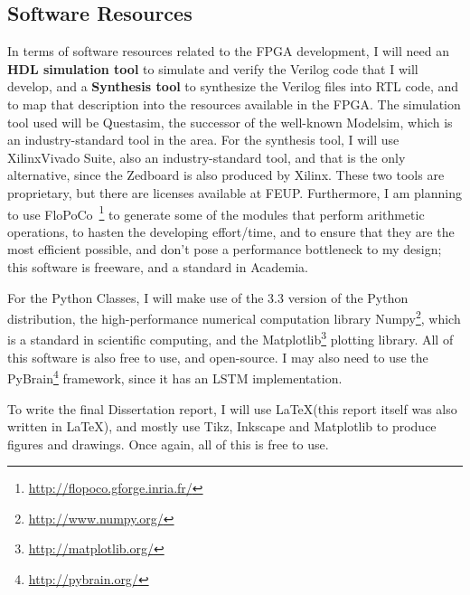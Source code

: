 \subsection{Software Resources}
In terms of software resources related to the FPGA development, I will need an \textbf{HDL simulation tool} to simulate and verify the Verilog code that I will develop, and a \textbf{Synthesis tool} to synthesize the Verilog files into RTL code, and to map that description into the resources available in the FPGA. The simulation tool used will be Questasim\texttrademark, the successor of the well-known Modelsim\texttrademark, which is an industry-standard tool in the area. For the synthesis tool, I will use Xilinx\textregistered Vivado Suite, also an industry-standard tool, and that is the only alternative, since the Zedboard is also produced by Xilinx\textregistered. These two tools are proprietary, but there are licenses available at FEUP. Furthermore, I am planning to use FloPoCo~\footnote{\href{http://flopoco.gforge.inria.fr/}{http://flopoco.gforge.inria.fr/}} to generate some of the modules that perform arithmetic operations, to hasten the developing effort/time, and to ensure that they are the most efficient possible, and don't pose a performance bottleneck to my design; this software is freeware, and a standard in Academia.

For the Python Classes, I will make use of the 3.3 version of the Python distribution, the high-performance numerical computation library Numpy\footnote{\href{http://www.numpy.org/}{http://www.numpy.org/}}, which is a standard in scientific computing, and the Matplotlib\footnote{\href{http://matplotlib.org/}{http://matplotlib.org/}} plotting library. All of this software is also free to use, and open-source. I may also need to use the PyBrain\footnote{\href{http://pybrain.org/}{http://pybrain.org/}} framework, since it has an LSTM implementation. 

To write the final Dissertation report, I will use \LaTeX (this report itself was also written in \LaTeX), and mostly use Tikz, Inkscape and Matplotlib to produce figures and drawings. Once again, all of this is free to use.
